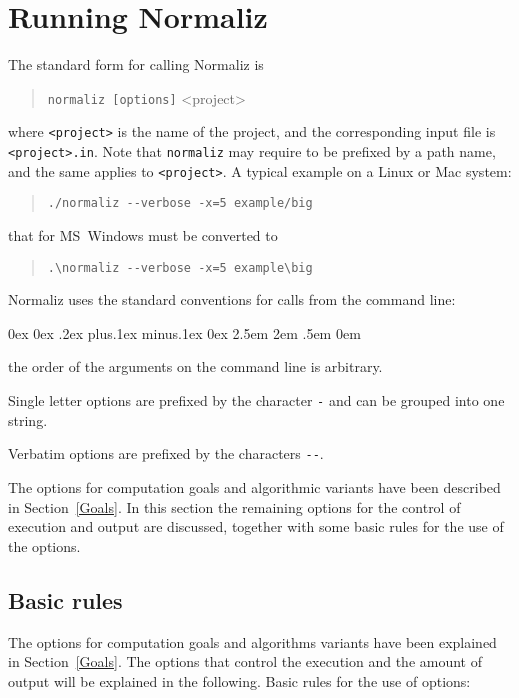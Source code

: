 \documentclass[12pt,a4paper]{scrartcl}
\newcounter{listi}
\newcommand{\stdli}{ \topsep0ex \partopsep0ex %
\parsep.2ex plus.1ex minus.1ex \itemsep0ex%
\leftmargin2.5em \labelwidth2em \labelsep.5em \rightmargin0em}%
\newenvironment{arab}{\begin{list}{\textup{(\arabic{listi})}}%
	{\usecounter{listi}\stdli}}{\end{list}}
\theoremstyle{definition}
\begin{document}
\section{Running Normaliz}\label{options}

The standard form for calling Normaliz is
\begin{quote}
	\verb|normaliz [options]| <project>
\end{quote}
where \verb|<project>| is the name of the project, and the corresponding input file is \verb|<project>.in|. Note that \verb|normaliz| may require to be prefixed by a path name, and the same applies to \verb|<project>|. A typical example on a Linux or Mac system:
\begin{quote}
	\verb|./normaliz --verbose -x=5 example/big|
\end{quote}
that for MS~Windows must be converted to
\begin{quote}
	\verb|.\normaliz --verbose -x=5 example\big|
\end{quote}

Normaliz uses the standard conventions for calls from the command line:
\begin{arab}
	\item the order of the arguments on the command line is arbitrary.
	\item Single letter options are prefixed by the character \verb|-| and can be grouped into one string.
	\item Verbatim options are prefixed by the characters \verb|--|.
\end{arab}

The options for computation goals and algorithmic variants have been described in Section~\ref{Goals}. In this section the remaining options for the control of execution and output are discussed, together with some basic rules for the use of the options.

\subsection{Basic rules}
The options for computation goals and algorithms variants have been explained in Section~\ref{Goals}. The options that control the execution and the amount of output will be explained in the following. Basic rules for the use of options:
\end{document}
